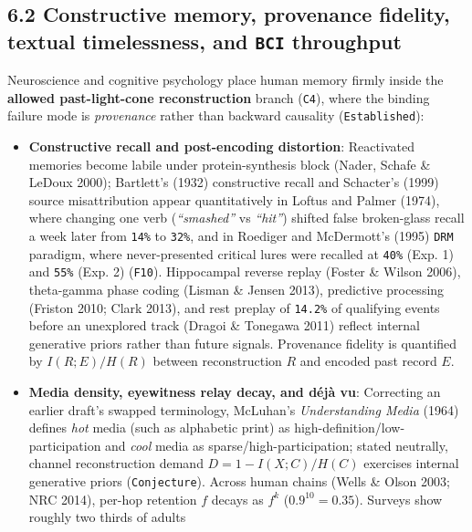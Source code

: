 \documentclass[10pt,letterpaper]{article}
\providecommand{\tightlist}{\setlength{\itemsep}{1pt}\setlength{\parskip}{0pt}}
\begin{document}
\subsection{\texorpdfstring{6.2 Constructive memory, provenance
fidelity, textual timelessness, and \texttt{BCI}
throughput}{6.2 Constructive memory, provenance fidelity, textual timelessness, and BCI throughput}}\label{constructive-memory-provenance-fidelity-textual-timelessness-and-bci-throughput}

Neuroscience and cognitive psychology place human memory firmly inside
the \textbf{allowed past-light-cone reconstruction} branch
(\texttt{C4}), where the binding failure mode is \emph{provenance}
rather than backward causality (\texttt{Established}):

\begin{itemize}
\tightlist
\item
  \textbf{Constructive recall and post-encoding distortion}: Reactivated
  memories become labile under protein-synthesis block (Nader, Schafe \&
  LeDoux 2000); Bartlett's (1932) constructive recall and Schacter's
  (1999) source misattribution appear quantitatively in Loftus and
  Palmer (1974), where changing one verb (\emph{``smashed''} vs
  \emph{``hit''}) shifted false broken-glass recall a week later from
  \texttt{14\%} to \texttt{32\%}, and in Roediger and McDermott's (1995)
  \texttt{DRM} paradigm, where never-presented critical lures were
  recalled at \texttt{40\%} (Exp. 1) and \texttt{55\%} (Exp. 2)
  (\texttt{F10}). Hippocampal reverse replay (Foster \& Wilson 2006),
  theta-gamma phase coding (Lisman \& Jensen 2013), predictive
  processing (Friston 2010; Clark 2013), and rest preplay of
  \texttt{14.2\%} of qualifying events before an unexplored track
  (Dragoi \& Tonegawa 2011) reflect internal generative priors rather
  than future signals. Provenance fidelity is quantified by
  \(I(R; E) / H(R)\) between reconstruction \(R\) and encoded past
  record \(E\).
\item
  \textbf{Media density, eyewitness relay decay, and déjà vu}:
  Correcting an earlier draft's swapped terminology, McLuhan's
  \emph{Understanding Media} (1964) defines \emph{hot} media (such as
  alphabetic print) as high-definition/low-participation and \emph{cool}
  media as sparse/high-participation; stated neutrally, channel
  reconstruction demand \(D = 1 - I(X; C)/H(C)\) exercises internal
  generative priors (\texttt{Conjecture}). Across human chains (Wells \&
  Olson 2003; NRC 2014), per-hop retention \(f\) decays as \(f^k\)
  (\(0.9^{10} = 0.35\)). Surveys show roughly two thirds of adults

\end{itemize}
\end{document}
